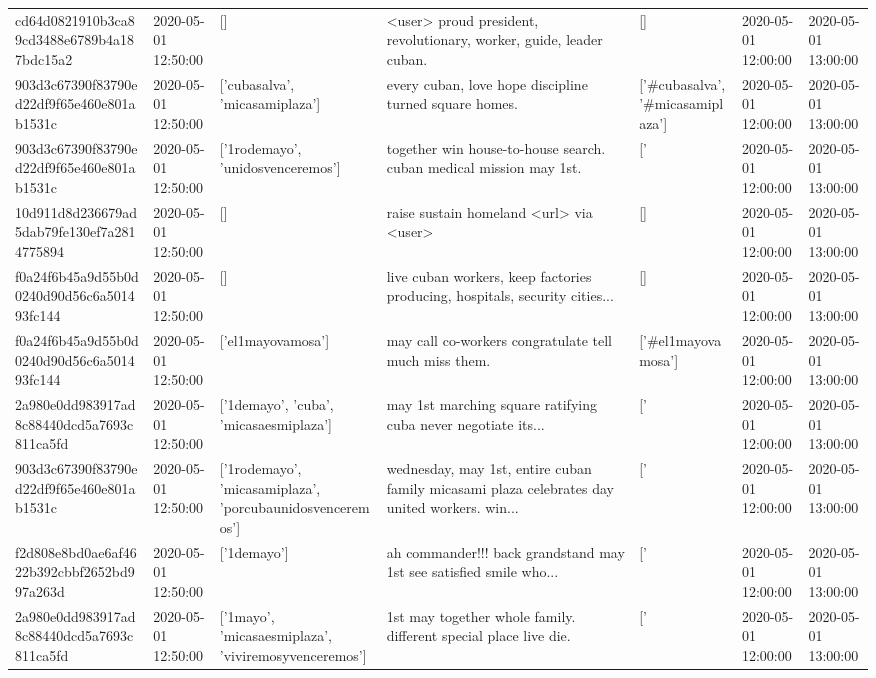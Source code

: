 \begin{tabular}{lllllll}
cd64d0821910b3ca89cd3488e6789b4a187bdc15a2 & 2020-05-01 12:50:00 & [] & <user> proud president, revolutionary, worker, guide, leader cuban. & [] & 2020-05-01 12:00:00 & 2020-05-01 13:00:00 \\
903d3c67390f83790ed22df9f65e460e801ab1531c & 2020-05-01 12:50:00 & ['cubasalva', 'micasamiplaza'] & every cuban, love hope discipline turned square homes. & ['#cubasalva', '#micasamiplaza'] & 2020-05-01 12:00:00 & 2020-05-01 13:00:00 \\
903d3c67390f83790ed22df9f65e460e801ab1531c & 2020-05-01 12:50:00 & ['1rodemayo', 'unidosvenceremos'] & together win house-to-house search. cuban medical mission may 1st. & ['#1rodemayo', '#unidosvenceremos'] & 2020-05-01 12:00:00 & 2020-05-01 13:00:00 \\
10d911d8d236679ad5dab79fe130ef7a2814775894 & 2020-05-01 12:50:00 & [] & raise sustain homeland <url> via <user> & [] & 2020-05-01 12:00:00 & 2020-05-01 13:00:00 \\
f0a24f6b45a9d55b0d0240d90d56c6a501493fc144 & 2020-05-01 12:50:00 & [] & live cuban workers, keep factories producing, hospitals, security cities... & [] & 2020-05-01 12:00:00 & 2020-05-01 13:00:00 \\
f0a24f6b45a9d55b0d0240d90d56c6a501493fc144 & 2020-05-01 12:50:00 & ['el1mayovamosa'] & may call co-workers congratulate tell much miss them. & ['#el1mayovamosa'] & 2020-05-01 12:00:00 & 2020-05-01 13:00:00 \\
2a980e0dd983917ad8c88440dcd5a7693c811ca5fd & 2020-05-01 12:50:00 & ['1demayo', 'cuba', 'micasaesmiplaza'] & may 1st marching square ratifying cuba never negotiate its... & ['#1demayo', '#cuba', '#micasaesmiplaza'] & 2020-05-01 12:00:00 & 2020-05-01 13:00:00 \\
903d3c67390f83790ed22df9f65e460e801ab1531c & 2020-05-01 12:50:00 & ['1rodemayo', 'micasamiplaza', 'porcubaunidosvenceremos'] & wednesday, may 1st, entire cuban family micasami plaza celebrates day united workers. win... & ['#1rodemayo', '#micasamiplaza', '#porcubaunidosvenceremos'] & 2020-05-01 12:00:00 & 2020-05-01 13:00:00 \\
f2d808e8bd0ae6af4622b392cbbf2652bd997a263d & 2020-05-01 12:50:00 & ['1demayo'] & ah commander!!! back grandstand may 1st see satisfied smile who... & ['#1demayo'] & 2020-05-01 12:00:00 & 2020-05-01 13:00:00 \\
2a980e0dd983917ad8c88440dcd5a7693c811ca5fd & 2020-05-01 12:50:00 & ['1mayo', 'micasaesmiplaza', 'viviremosyvenceremos'] & 1st may together whole family. different special place live die. & ['#1mayo', '#micasaesmiplaza', '#viviremosyvenceremos'] & 2020-05-01 12:00:00 & 2020-05-01 13:00:00 \\

\end{tabular}
